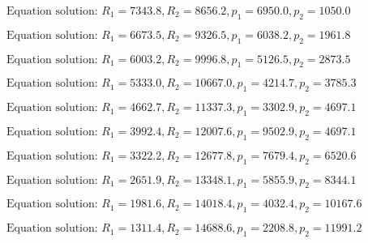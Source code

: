 \documentclass[11pt]{article}
\newcommand{\prompt}[4]{
        {\ttfamily\llap{{\color{#2}[#3]:\hspace{3pt}#4}}\vspace{-\baselineskip}}
    }
\begin{document}
    
 
            
\prompt{Out}{outcolor}{12}{}
    
    $\text{Equation solution: } R_1=7343.8,R_2=8656.2, p_1=6950.0, p_2=1050.0$

    
 
            
\prompt{Out}{outcolor}{12}{}
    
    $\text{Equation solution: } R_1=6673.5,R_2=9326.5, p_1=6038.2, p_2=1961.8$

    
 
            
\prompt{Out}{outcolor}{12}{}
    
    $\text{Equation solution: } R_1=6003.2,R_2=9996.8, p_1=5126.5, p_2=2873.5$

    
 
            
\prompt{Out}{outcolor}{12}{}
    
    $\text{Equation solution: } R_1=5333.0,R_2=10667.0, p_1=4214.7, p_2=3785.3$

    
 
            
\prompt{Out}{outcolor}{12}{}
    
    $\text{Equation solution: } R_1=4662.7,R_2=11337.3, p_1=3302.9, p_2=4697.1$

    
 
            
\prompt{Out}{outcolor}{12}{}
    
    $\text{Equation solution: } R_1=3992.4,R_2=12007.6, p_1=9502.9, p_2=4697.1$

    
 
            
\prompt{Out}{outcolor}{12}{}
    
    $\text{Equation solution: } R_1=3322.2,R_2=12677.8, p_1=7679.4, p_2=6520.6$

    
 
            
\prompt{Out}{outcolor}{12}{}
    
    $\text{Equation solution: } R_1=2651.9,R_2=13348.1, p_1=5855.9, p_2=8344.1$

    
 
            
\prompt{Out}{outcolor}{12}{}
    
    $\text{Equation solution: } R_1=1981.6,R_2=14018.4, p_1=4032.4, p_2=10167.6$

    
 
            
\prompt{Out}{outcolor}{12}{}
    
    $\text{Equation solution: } R_1=1311.4,R_2=14688.6, p_1=2208.8, p_2=11991.2$

    
 
            
\prompt{Out}{outcolor}{12}{}
    
\end{document}
